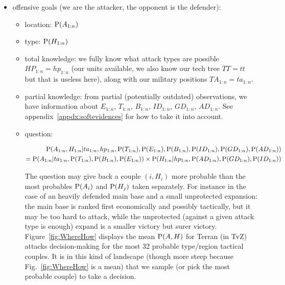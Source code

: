 \begin{itemize}
    \item offensive goals (we are the attacker, the opponent is the defender): 
    \begin{itemize}
        \item location: $\mathrm{P}(A_{1:n})$
        \item type: $\mathrm{P}(H_{1:n})$
        \item total knowledge: we fully know what attack types are possible $HP_{1:n}=hp_{1:n}$ (our units available, we also know our tech tree $TT=tt$ but that is useless here), along with our military positions $TA_{1:n}=ta_{1:n}$.
        \item partial knowledge: from partial (potentially outdated) observations, we have information about $E_{1:n}$, $T_{1:n}$, $B_{1:n}$, $ID_{1:n}$, $GD_{1:n}$, $AD_{1:n}$. See appendix~\ref{appdx:softevidences} for how to take it into account.
        \item question: 
\begin{small}
\begin{eqnarray*}
 \mathrm{P}(A_{1:n},H_{1:n}|ta_{1:n},hp_{1:n},\mathrm{P}(T_{1:n}),\mathrm{P}(E_{1:n}),\mathrm{P}(B_{1:n}),\mathrm{P}(ID_{1:n}),\mathrm{P}(GD_{1:n}),\mathrm{P}(AD_{1:n}))\\
= \mathrm{P}(A_{1:n}|ta_{1:n},\mathrm{P}(T_{1:n}),\mathrm{P}(B_{1:n}),\mathrm{P}(E_{1:n}))\times \mathrm{P}(H_{1:n}|hp_{1:n},\mathrm{P}(AD_{1:n}),\mathrm{P}(GD_{1:n}),\mathrm{P}(ID_{1:n}))
\end{eqnarray*}
\end{small}
The question may give back a couple $(i,H_i)$ more probable than the most probables $\mathrm{P}(A_i)$ and $\mathrm{P}(H_j)$ taken separately. For instance in the case of an heavily defended main base and a small unprotected expansion: the main base is ranked first economically and possibly tactically, but it may be too hard to attack, while the unprotected (against a given attack type is enough) expand is a smaller victory but surer victory. Figure~\ref{fig:WhereHow} displays the mean $\mathrm{P}(A,H)$ for Terran (in TvZ) attacks decision-making for the most 32 probable type/region tactical couples. It is in this kind of landscape (though more steep because Fig.~\ref{fig:WhereHow} is a mean) that we sample (or pick the most probable couple) to take a decision.
    \end{itemize}

\end{itemize}

